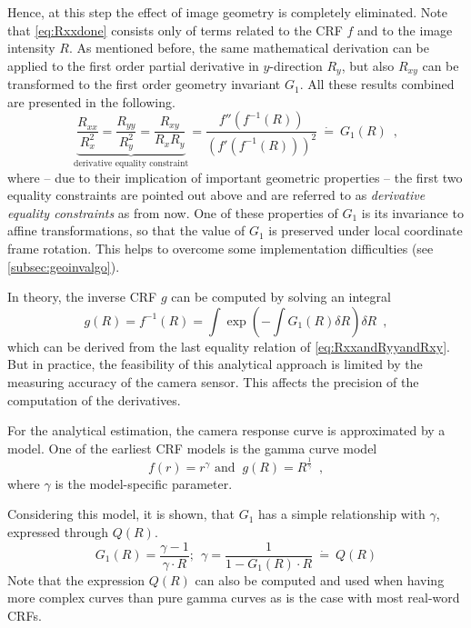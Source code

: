 Hence, at this step the effect of image geometry is completely eliminated. Note that \autoref{eq:Rxxdone} consists only of terms related to the CRF $f$ and to the image intensity $R$. As mentioned before, the same mathematical derivation can be applied to the first order partial derivative in $y$-direction $R_y$, but also $R_{xy}$ can be transformed to the first order geometry invariant $G_1$. All these results combined are presented in the following.
\begin{equation}
	\underbrace{\frac{R_{xx}}{R_x^2} = \frac{R_{yy}}{R_y^2} = \frac{R_{xy}}{R_x R_y}}_{\text{derivative equality constraint}} = \frac{f''(f^{-1}(R))}{(f'(f^{-1}(R)))^2} \ \dot{=} \ G_1(R) \enspace ,
	\label{eq:RxxandRyyandRxy}
\end{equation}
where -- due to their implication of important geometric properties -- the first two equality constraints are pointed out above and are referred to as \emph{derivative equality constraints} as from now. One of these properties of $G_1$ is its invariance to affine transformations, so that the value of $G_1$ is preserved under local coordinate frame rotation. This helps to overcome some implementation difficulties (see \autoref{subsec:geoinvalgo}). 

In theory, the inverse CRF $g$ can be computed by solving an integral
\begin{equation}
	g(R) = f^{-1}(R) = \int{\exp \left(-\int{G_1(R)\delta R} \right) \delta R} \enspace ,
	\label{eq:integralsolution}
\end{equation}
which can be derived from the last equality relation of \autoref{eq:RxxandRyyandRxy}. But in practice, the feasibility of this analytical approach is limited by the measuring accuracy of the camera sensor. This affects the precision of the computation of the derivatives.

For the analytical estimation, the camera response curve is approximated by a model. One of the earliest CRF models is the gamma curve model
\begin{equation}
	f(r) = r^{\gamma} \text{ and } \ g(R) = R^{\frac{1}{\gamma}} \enspace ,
	\label{eq:gammacurves}
\end{equation}
where $\gamma$ is the model-specific parameter.

Considering this model, it is shown, that $G_1$ has a simple relationship with $\gamma$, expressed through $Q(R)$.
\begin{equation}
	G_1(R) = \frac{\gamma - 1}{\gamma \cdot R}; \ \ \gamma = \frac{1}{1-G_1(R) \cdot R}\ \dot{=}\ Q(R)
	\label{eq:G1RtoQR}
\end{equation}
Note that the expression $Q(R)$ can also be computed and used when having more complex curves than pure gamma curves as is the case with most real-word CRFs.

